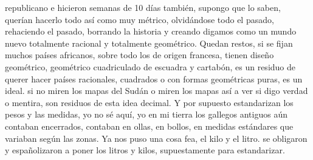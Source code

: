 republicano e hicieron semanas de 10 días también, supongo que lo saben, querían hacerlo todo así como muy métrico, olvidándose todo el pasado, rehaciendo el pasado, borrando la historia y creando digamos como un mundo nuevo totalmente racional y totalmente geométrico. Quedan restos, si se fijan muchos países africanos, sobre todo los de origen francesa, tienen diseño geométrico, geométrico cuadriculado de escuadra y cartabón, es un residuo de querer hacer países racionales, cuadrados o con formas geométricas puras, es un ideal.  si no miren los mapas del Sudán o miren los mapas así a ver si digo verdad o mentira, son residuos de esta idea decimal. Y por supuesto estandarizan los pesos y las medidas, yo no sé aquí, yo en mi tierra los gallegos antiguos aún contaban encerrados, contaban en ollas, en bollos, en medidas estándares que variaban según las zonas. Ya nos puso una cosa fea, el kilo y el litro. se obligaron y españolizaron a poner los litros y kilos, supuestamente para estandarizar. 

